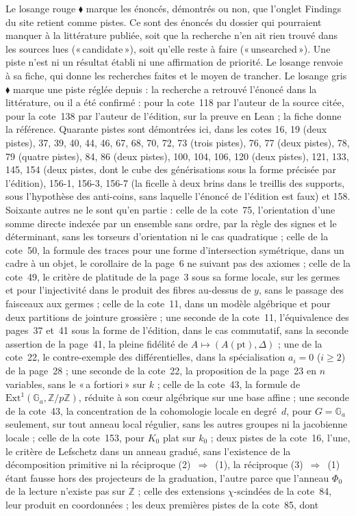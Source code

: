 \documentclass[11pt]{article}
\newcommand{\q}[1]{«\,#1\,»}
\theoremstyle{plain}
\theoremstyle{definition}
\theoremstyle{plain}
\theoremstyle{definition}
\theoremstyle{remark}
\renewcommand{\_}{\bkunderscore\allowbreak}
\begin{document}
Le losange rouge \textcolor{piste}{\ensuremath{\blacklozenge}} marque les énoncés, démontrés ou non, que l'onglet Findings du site retient comme pistes. Ce sont des énoncés du dossier qui pourraient manquer à la littérature publiée, soit que la recherche n'en ait rien trouvé dans les sources lues (\q{candidate}), soit qu'elle reste à faire (\q{unsearched}). Une piste n'est ni un résultat établi ni une affirmation de priorité. Le losange renvoie à sa fiche, qui donne les recherches faites et le moyen de trancher. Le losange gris \textcolor{pisteresolue}{\ensuremath{\blacklozenge}} marque une piste réglée depuis : la recherche a retrouvé l'énoncé dans la littérature, ou il a été confirmé : pour la cote~118 par l'auteur de la source citée, pour la cote~138 par l'auteur de l'édition, sur la preuve en Lean ; la fiche donne la référence. Quarante pistes sont démontrées ici, dans les cotes 16, 19 (deux pistes), 37, 39, 40, 44, 46, 67, 68, 70, 72, 73 (trois pistes), 76, 77 (deux pistes), 78, 79 (quatre pistes), 84, 86 (deux pistes), 100, 104, 106, 120 (deux pistes), 121, 133, 145, 154 (deux pistes, dont le cube des générisations sous la forme précisée par l'édition), 156-1, 156-3, 156-7 (la ficelle à deux brins dans le treillis des supports, sous l'hypothèse des anti-coins, sans laquelle l'énoncé de l'édition est faux) et 158. Soixante autres ne le sont qu'en partie : celle de la cote~75, l'orientation d'une somme directe indexée par un ensemble sans ordre, par la règle des signes et le déterminant, sans les torseurs d'orientation ni le cas quadratique ; celle de la cote~50, la formule des traces pour une forme d'intersection symétrique, dans un cadre à un objet, le corollaire de la page~6 ne suivant pas des axiomes ; celle de la cote~49, le critère de platitude de la page~3 sous sa forme locale, sur les germes et pour l'injectivité dans le produit des fibres au-dessus de $y$, sans le passage des faisceaux aux germes ; celle de la cote~11, dans un modèle algébrique et pour deux partitions de jointure grossière ; une seconde de la cote~11, l'équivalence des pages~37 et~41 sous la forme de l'édition, dans le cas commutatif, sans la seconde assertion de la page~41, la pleine fidélité de $A \mapsto (A(\mathrm{pt}), \Delta)$ ; une de la cote~22, le contre-exemple des différentielles, dans la spécialisation $a_i = 0$ ($i \geq 2$) de la page~28 ; une seconde de la cote~22, la proposition de la page~23 en $n$ variables, sans le \q{a fortiori} sur $k$ ; celle de la cote~43, la formule de $\mathrm{Ext}^1(\mathbb G_a, \mathbb Z/p\mathbb Z)$, réduite à son cœur algébrique sur une base affine ; une seconde de la cote~43, la concentration de la cohomologie locale en degré~$d$, pour $G = \mathbb G_a$ seulement, sur tout anneau local régulier, sans les autres groupes ni la jacobienne locale ; celle de la cote~153, pour $K_0$ plat sur $k_0$ ; deux pistes de la cote~16, l'une, le critère de Lefschetz dans un anneau gradué, sans l'existence de la décomposition primitive ni la réciproque (2)~$\Rightarrow$~(1), la réciproque (3)~$\Rightarrow$~(1) étant fausse hors des projecteurs de la graduation, l'autre parce que l'anneau $\Phi_0$ de la lecture n'existe pas sur $\mathbb Z$ ; celle des extensions $\chi$-scindées de la cote~84, leur produit en coordonnées ; les deux premières pistes de la cote~85, dont 
\end{document}
